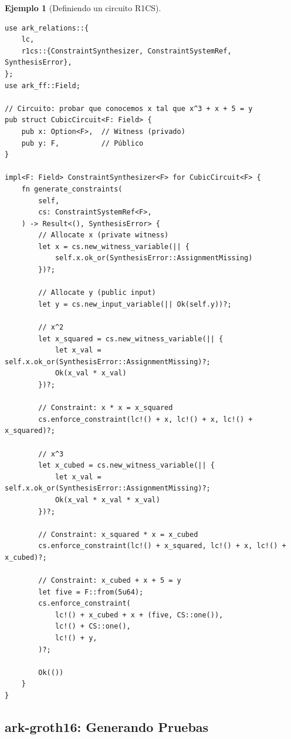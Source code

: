 \documentclass[11pt,a4paper,twoside,openright]{book}
\theoremstyle{definition}
\newtheorem{example}{Ejemplo}[chapter]
\theoremstyle{plain}
\theoremstyle{remark}
\begin{document}
\begin{example}[Definiendo un circuito R1CS]
\begin{verbatim}
use ark_relations::{
    lc,
    r1cs::{ConstraintSynthesizer, ConstraintSystemRef, SynthesisError},
};
use ark_ff::Field;

// Circuito: probar que conocemos x tal que x^3 + x + 5 = y
pub struct CubicCircuit<F: Field> {
    pub x: Option<F>,  // Witness (privado)
    pub y: F,          // Público
}

impl<F: Field> ConstraintSynthesizer<F> for CubicCircuit<F> {
    fn generate_constraints(
        self,
        cs: ConstraintSystemRef<F>,
    ) -> Result<(), SynthesisError> {
        // Allocate x (private witness)
        let x = cs.new_witness_variable(|| {
            self.x.ok_or(SynthesisError::AssignmentMissing)
        })?;
        
        // Allocate y (public input)
        let y = cs.new_input_variable(|| Ok(self.y))?;
        
        // x^2
        let x_squared = cs.new_witness_variable(|| {
            let x_val = self.x.ok_or(SynthesisError::AssignmentMissing)?;
            Ok(x_val * x_val)
        })?;
        
        // Constraint: x * x = x_squared
        cs.enforce_constraint(lc!() + x, lc!() + x, lc!() + x_squared)?;
        
        // x^3
        let x_cubed = cs.new_witness_variable(|| {
            let x_val = self.x.ok_or(SynthesisError::AssignmentMissing)?;
            Ok(x_val * x_val * x_val)
        })?;
        
        // Constraint: x_squared * x = x_cubed
        cs.enforce_constraint(lc!() + x_squared, lc!() + x, lc!() + x_cubed)?;
        
        // Constraint: x_cubed + x + 5 = y
        let five = F::from(5u64);
        cs.enforce_constraint(
            lc!() + x_cubed + x + (five, CS::one()),
            lc!() + CS::one(),
            lc!() + y,
        )?;
        
        Ok(())
    }
}
\end{verbatim}
\end{example}

\subsection{ark-groth16: Generando Pruebas}
\end{document}
